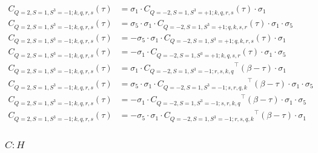\begin{equation}
  \begin{aligned}
    C_{Q=2,S=1,S^3=-1;k,q,r,s} (\tau) &= \sigma_1\cdot{C_{Q=-2,S=1,S^3=+1;k,q,r,s}} (\tau)\cdot\sigma_1 
    \\
    C_{Q=2,S=1,S^3=-1;k,q,r,s} (\tau) &= \sigma_5\cdot \sigma_1\cdot{C_{Q=-2,S=1,S^3=+1;q,k,s,r}} (\tau)\cdot\sigma_1\cdot\sigma_5
    \\
    C_{Q=2,S=1,S^3=-1;k,q,r,s} (\tau) &= - \sigma_5\cdot \sigma_1\cdot{C_{Q=-2,S=1,S^3=+1;q,k,r,s}} (\tau)\cdot\sigma_1
    \\
    C_{Q=2,S=1,S^3=-1;k,q,r,s} (\tau) &= - \sigma_1\cdot{C_{Q=-2,S=1,S^3=+1;k,q,s,r}} (\tau)\cdot\sigma_1\cdot\sigma_5
    \\
    C_{Q=2,S=1,S^3=-1;k,q,r,s} (\tau) &= \sigma_1\cdot{C_{Q=-2,S=1,S^3=-1;r,s,k,q}}^\top (\beta-\tau) \cdot\sigma_1 
    \\
    C_{Q=2,S=1,S^3=-1;k,q,r,s} (\tau) &= \sigma_5\cdot \sigma_1\cdot{C_{Q=-2,S=1,S^3=-1;s,r,q,k}}^\top (\beta-\tau) \cdot\sigma_1\cdot\sigma_5
    \\
    C_{Q=2,S=1,S^3=-1;k,q,r,s} (\tau) &= - \sigma_1\cdot{C_{Q=-2,S=1,S^3=-1;s,r,k,q}}^\top (\beta-\tau) \cdot\sigma_1\cdot\sigma_5
    \\
    C_{Q=2,S=1,S^3=-1;k,q,r,s} (\tau) &= - \sigma_5\cdot \sigma_1\cdot{C_{Q=-2,S=1,S^3=-1;r,s,q,k}}^\top (\beta-\tau) \cdot\sigma_1
    \\
  \end{aligned}
\end{equation}

\subsubsection{$C : H$}

